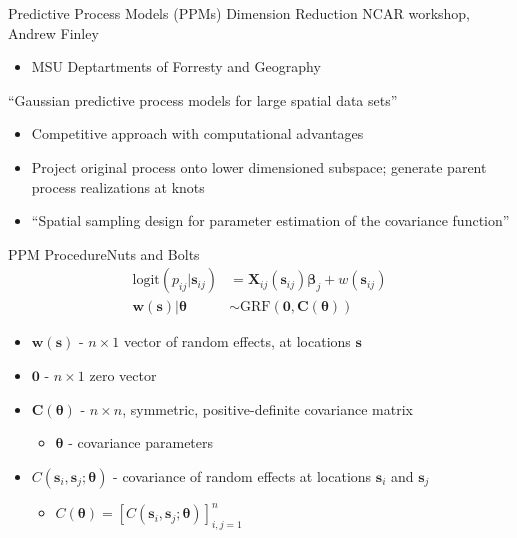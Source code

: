 \documentclass{beamer}
\begin{document}
\begin{frame}{Predictive Process Models (PPMs)} {Dimension Reduction}
NCAR workshop, Andrew Finley 

  \begin{itemize}
  \addtolength{\itemsep}{0.5\baselineskip}
  \item MSU Deptartments of Forresty and Geography
  \end{itemize}
  
``Gaussian predictive process models for large spatial data sets'' \citep{Banerjee2008}

\begin{itemize}
\addtolength{\itemsep}{0.5\baselineskip}
\item Competitive approach with computational advantages
\item Project original process onto lower dimensioned subspace; generate parent process realizations at knots
\item ``Spatial sampling design for parameter estimation of the covariance function'' \citep{Zhu2005}
\end{itemize}
\end{frame}

\begin{frame}{PPM Procedure}{Nuts and Bolts}
\begin{align*}
\text{logit}(p_{ij}|\pmb{s}_{ij}) &= \pmb{X}_{ij}(\pmb{s}_{ij}) \pmb{\beta}_{j} + w(\pmb{s}_{ij}) \\
\pmb{w}(\pmb{s}) | \pmb{\theta} &\sim \text{GRF}(\pmb{0}, \pmb{C}(\pmb{\theta}))
\end{align*}
\begin{itemize}
\addtolength{\itemsep}{0.5\baselineskip}
\item $\pmb{w}(\pmb{s})$ - $n \times 1$ vector of random effects, at locations $\pmb{s}$ 
\item $\pmb{0}$ - $n \times 1$ zero vector 
\item $\pmb{C}(\pmb{\theta})$ - $n \times n$, symmetric, positive-definite covariance matrix
    \begin{itemize}
    \item $\pmb{\theta}$ - covariance parameters
    \end{itemize}
\item $C(\pmb{s}_{i}, \pmb{s}_{j}; \pmb{\theta})$ - covariance of random effects  at locations $\pmb{s}_{i}$ and $\pmb{s}_{j}$
      \begin{itemize}
      \addtolength{\itemsep}{0.5\baselineskip}
      \item $C(\pmb{\theta}) = [C(\pmb{s}_{i}, \pmb{s}_{j}; \pmb{\theta})]_{i,j=1}^{n}$
      \end{itemize}
\end{itemize}
\end{frame}
\end{document}
